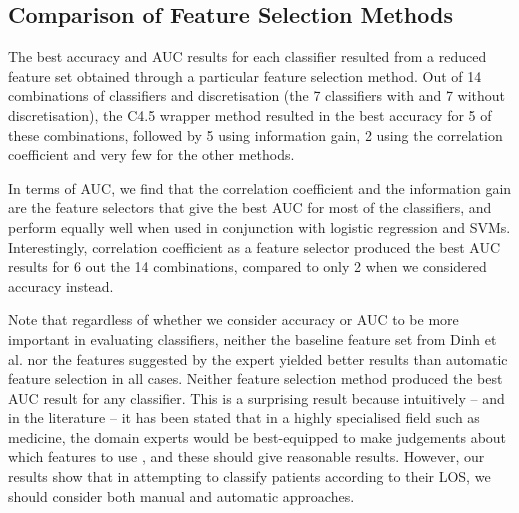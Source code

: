 \documentclass{article}
\begin{document}



\subsection{Comparison of Feature Selection Methods}
The best accuracy and AUC results for
each classifier resulted from a reduced feature set obtained through a
particular feature selection method. Out of 14 combinations of classifiers
and discretisation (the 7 classifiers with and 7 without
discretisation), the C4.5 wrapper method resulted in the best
accuracy for 5 of these combinations, followed by 5 using information gain,
2 using the correlation coefficient and very few for the other methods.

In terms of AUC, we
find that the correlation coefficient and the information gain are the feature
selectors that give the best AUC for most of the classifiers, and perform
equally well when used in conjunction with logistic regression and SVMs.
Interestingly, correlation coefficient as a feature selector produced the
best AUC results for 6 out the 14 combinations, compared to only 2 when we
considered accuracy instead.

Note that regardless of whether we consider accuracy or AUC to be more
important in evaluating classifiers, neither the baseline
feature set from Dinh et al. \cite{Dinh2013a} nor the features suggested by
the expert yielded better
results than automatic feature selection in all cases. Neither
feature selection method produced the best AUC result for any classifier.
This is a surprising result because intuitively -- and in the literature -- it
has been stated that in a highly specialised field such as medicine, the domain
experts would be best-equipped to make judgements about which features to
use \cite{Witten2005}, and these should give reasonable results. However,
our results show that in attempting to classify patients according to their
LOS, we should consider both manual and automatic approaches.
\end{document}
